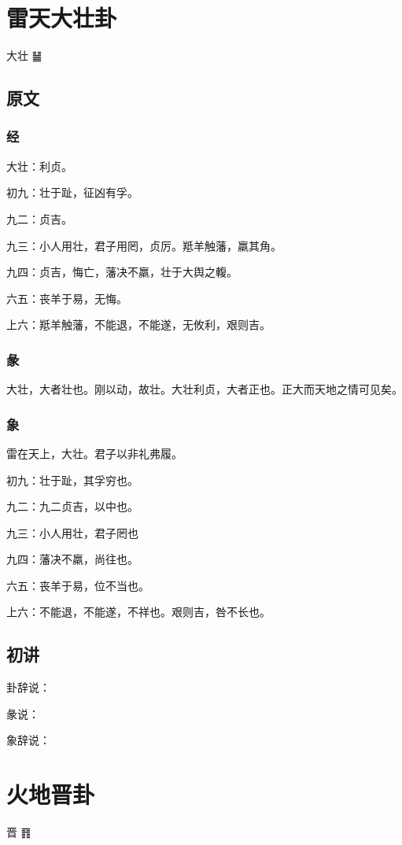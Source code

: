 \documentclass[12pt,oneside]{book}
\begin{document}
\chapter{雷天大壮卦}
大壮 {\Large ䷡}

\section{原文}

\subsection{经}
大壮：利贞。

初九：壮于趾，征凶有孚。

九二：贞吉。

九三：小人用壮，君子用罔，贞厉。羝羊触藩，羸其角。

九四：贞吉，悔亡，藩决不羸，壮于大舆之輹。

六五：丧羊于易，无悔。

上六：羝羊触藩，不能退，不能遂，无攸利，艰则吉。

\subsection{彖}
大壮，大者壮也。刚以动，故壮。大壮利贞，大者正也。正大而天地之情可见矣。

\subsection{象}
雷在天上，大壮。君子以非礼弗履。

初九：壮于趾，其孚穷也。

九二：九二贞吉，以中也。

九三：小人用壮，君子罔也

九四：藩决不羸，尚往也。

六五：丧羊于易，位不当也。

上六：不能退，不能遂，不祥也。艰则吉，咎不长也。

\section{初讲}
卦辞说：

彖说：

象辞说：

\chapter{火地晋卦}
晋 {\Large ䷢}
\end{document}
